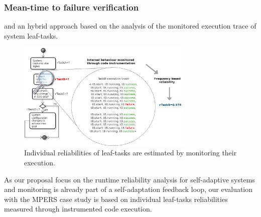 \subsubsection{Mean-time to failure verification}

and an hybrid approach based on the analysis of the monitored execution trace of system leaf-tasks.

\begin{figure}[ht!]
\centering
\includegraphics[width=0.75\textwidth]{imgs/MON_PMC.png}
\caption{Individual reliabilities of leaf-tasks are estimated by monitoring their execution.}
\label{fig:MON_PMC}
\end{figure}



As our proposal focus on the runtime reliability analysis for self-adaptive systems and monitoring is already part of a self-adaptation feedback loop, our evaluation with the MPERS case study is based on individual leaf-tasks reliabilities measured through instrumented code execution.



